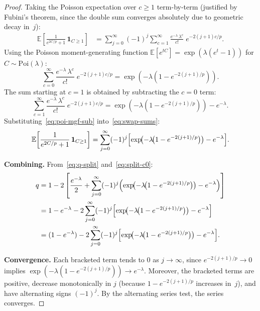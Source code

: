 \documentclass[11pt,a4paper]{article}
\newcommand{\Poi}{\mathrm{Poi}}
\newcommand{\E}{\mathbb{E}}
\begin{document}
\begin{proof}
Taking the Poisson expectation over $c \ge 1$ term-by-term (justified by
Fubini's theorem, since the double sum converges absolutely due to geometric decay in~$j$):
\begin{align}
  \E\!\left[\frac{1}{e^{2C/p} + 1}\,\mathbf{1}_{C \ge 1}\right]
  &= \sum_{j=0}^{\infty} (-1)^j
     \sum_{c=1}^{\infty}
     \frac{e^{-\lambda}\,\lambda^c}{c!}\;
     e^{-2(j+1)c/p}.
  \label{eq:swap-sums}
\end{align}
Using the Poisson moment-generating function
$\E[e^{tC}] = \exp(\lambda(e^t - 1))$ for $C \sim \Poi(\lambda)$:
\begin{equation}\label{eq:poi-mgf}
  \sum_{c=0}^{\infty}
  \frac{e^{-\lambda}\,\lambda^c}{c!}\; e^{-2(j+1)c/p}
  = \exp\!\left(-\lambda\!\left(1 - e^{-2(j+1)/p}\right)\right).
\end{equation}
The sum starting at $c = 1$ is obtained by subtracting the $c = 0$ term:
\begin{equation}\label{eq:poi-mgf-sub}
  \sum_{c=1}^{\infty}
  \frac{e^{-\lambda}\,\lambda^c}{c!}\; e^{-2(j+1)c/p}
  = \exp\!\left(-\lambda\!\left(1 - e^{-2(j+1)/p}\right)\right)
    - e^{-\lambda}.
\end{equation}
Substituting~\eqref{eq:poi-mgf-sub} into~\eqref{eq:swap-sums}:
\begin{equation}\label{eq:E-c-ge-1}
  \E\!\left[\frac{1}{e^{2C/p} + 1}\,\mathbf{1}_{C \ge 1}\right]
  = \sum_{j=0}^{\infty} (-1)^j
    \Bigl[\exp\!\bigl(-\lambda\!\bigl(1 - e^{-2(j+1)/p}\bigr)\bigr)
          - e^{-\lambda}\Bigr].
\end{equation}

\medskip\noindent\textbf{Combining.}
From~\eqref{eq:q-split} and~\eqref{eq:split-c0}:
\begin{align}
  q &= 1 - 2\left[\frac{e^{-\lambda}}{2}
       + \sum_{j=0}^{\infty}(-1)^j
         \Bigl(\exp\!\bigl(-\lambda\!\bigl(1 - e^{-2(j+1)/p}\bigr)\bigr)
               - e^{-\lambda}\Bigr)\right] \notag \\
    &= 1 - e^{-\lambda}
       - 2\sum_{j=0}^{\infty}(-1)^j
         \Bigl[\exp\!\bigl(-\lambda\!\bigl(1 - e^{-2(j+1)/p}\bigr)\bigr)
               - e^{-\lambda}\Bigr] \notag \\
    &= (1 - e^{-\lambda})
       - 2\sum_{j=0}^{\infty}(-1)^j
         \Bigl[\exp\!\bigl(-\lambda\!\bigl(1 - e^{-2(j+1)/p}\bigr)\bigr)
               - e^{-\lambda}\Bigr].
  \label{eq:q-final}
\end{align}

\medskip\noindent\textbf{Convergence.}
Each bracketed term tends to $0$ as $j \to \infty$, since
$e^{-2(j+1)/p} \to 0$ implies
$\exp(-\lambda(1 - e^{-2(j+1)/p})) \to e^{-\lambda}$.
Moreover, the bracketed terms are positive, decrease monotonically in $j$
(because $1 - e^{-2(j+1)/p}$ increases in~$j$), and have alternating
signs $(-1)^j$.  By the alternating series test, the series converges.
\end{proof}
\end{document}
